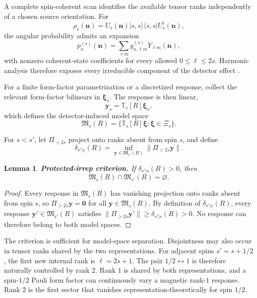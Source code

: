 \documentclass[12pt]{iopjournal}
\newcommand{\Mcal}{\mathfrak M}
\newtheorem{lemma}{Lemma}[section]
\theoremstyle{definition}
\theoremstyle{remark}
\begin{document}
A complete spin-coherent scan identifies the available tensor ranks independently of a chosen source orientation. For
\begin{equation}
\rho_s(\bm n)=U_s(\bm n)|s,s\rangle\langle s,s|U_s^\dagger(\bm n),
\end{equation}
the angular probability admits an expansion
\begin{equation}
p_a^{(s)}(\bm n)=\sum_{\ell m}y^{(s)}_{a,\ell m}Y_{\ell m}(\bm n),
\end{equation}
with nonzero coherent-state coefficients for every allowed $0\le\ell\le2s$. Harmonic analysis therefore exposes every irreducible component of the detector effect \cite{MarvianSpekkens2014}.

For a finite form-factor parametrization or a discretized response, collect the relevant form-factor bilinears in $\bm\xi_s$. The response is then linear,
\begin{equation}
\boxed{\bm y_s=\mathbb T_s[R]\bm\xi_s,}
\label{eq:transfer-map}
\end{equation}
which defines the detector-induced model space
\begin{equation}
\boxed{
\Mcal_s(R)=\{\mathbb T_s[R]\bm\xi:\bm\xi\in\Xi_s\}.
}
\label{eq:model-space}
\end{equation}

For $s<s'$, let $\Pi_{>2s}$ project onto ranks absent from spin $s$, and define
\begin{equation}
\delta_{s'|s}(R)=
\inf_{\bm y\in\Mcal_{s'}(R)}
\|\Pi_{>2s}\bm y\|.
\end{equation}

\begin{lemma}
\textbf{Protected-irrep criterion.}
If $\delta_{s'|s}(R)>0$, then
\begin{equation}
\Mcal_s(R)\cap\Mcal_{s'}(R)=\varnothing.
\end{equation}
\end{lemma}
\begin{proof}
Every response in $\Mcal_s(R)$ has vanishing projection onto ranks absent from spin $s$, so
$\Pi_{>2s}\bm y=\bm 0$ for all $\bm y\in\Mcal_s(R)$.
By definition of $\delta_{s'|s}(R)$, every response
$\bm y'\in\Mcal_{s'}(R)$ satisfies
$\|\Pi_{>2s}\bm y'\|\ge\delta_{s'|s}(R)>0$.
No response can therefore belong to both model spaces.
\end{proof}

The criterion is sufficient for model-space separation. Disjointness may also occur in tensor ranks shared by the two representations. For adjacent spins $s'=s+1/2$, the first new internal rank is $\ell=2s+1$. The pair $1/2\leftrightarrow1$ is therefore naturally controlled by rank $2$. Rank $1$ is shared by both representations, and a spin-$1/2$ Pauli form factor can continuously vary a magnetic rank-$1$ response. Rank $2$ is the first sector that vanishes representation-theoretically for spin $1/2$.
\end{document}
